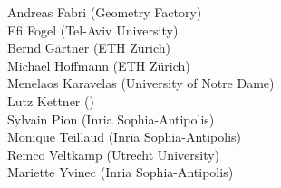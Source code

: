 
Andreas Fabri ({\sc Geometry Factory}) \\
Efi Fogel (Tel-Aviv University) \\
Bernd G\"artner (ETH Z\"urich) \\
Michael Hoffmann (ETH Z\"urich) \\
Menelaos Karavelas (University of Notre Dame)\\
Lutz Kettner ()\\
Sylvain Pion ({\sc Inria} Sophia-Antipolis)\\
Monique Teillaud ({\sc Inria} Sophia-Antipolis)\\
Remco Veltkamp (Utrecht University)\\
Mariette Yvinec ({\sc Inria} Sophia-Antipolis)
